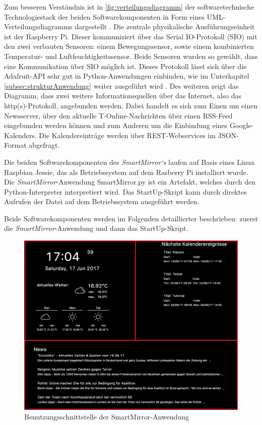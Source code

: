 Zum besseren Verständnis ist in \autoref{fig:verteilungsdiagramm} der softwaretechnische Technologiestack der beiden Softwarekomponenten in Form eines UML-Verteilungsdiagramms dargestellt \cite{booch1999uml}. Die zentrale physikalische Ausführungseinheit ist der Raspberry Pi. Dieser kommuniziert über das Serial IO-Protokoll (SIO) mit den zwei verbauten Sensoren: einem Bewegungssensor, sowie einem kombinierten Temperatur- und Luftfeuchtigkeitssensor. Beide Sensoren wurden so gewählt, dass eine Kommunikation über SIO möglich ist. Dieses Protokoll lässt sich über die Adafruit-API sehr gut in Python-Anwendungen einbinden, wie im Unterkapitel \autoref{subsec:strukturAnwendung} weiter ausgeführt wird \cite{adafruit2017}. Des weiteren zeigt das Diagramm, dass zwei weitere Informationsquellen über das Internet, also das http(s)-Protokoll, angebunden werden. Dabei handelt es sich zum Einen um  
einen Newsserver, über den aktuelle T-Online-Nachrichten über einen RSS-Feed eingebunden werden können und zum Anderen um die Einbindung eines Google-Kalenders\cite{feedparserLib}\cite{vayssiere2004system}. Die Kalendereinträge werden über  REST-Webservices im JSON-Format abgefragt\cite{bricalliweb}\cite{bray2014javascript}. 

Die beiden Softwarekomponenten des \textit{SmartMirror`s} laufen auf Basis eines Linux Raspbian Jessie, das als Betriebssystem auf dem Rasberry Pi installiert wurde. Die \textit{SmartMirror}-Anwendung \glqq SmartMirror.py \grqq ist ein Artefakt, welches durch den Python-Interpreter interpretiert wird. Das StartUp-Skript kann durch direktes Aufrufen der Datei auf dem Betriebssystem ausgeführt werden. 

Beide Softwarekomponenten werden im Folgenden detaillierter beschrieben: zuerst die \textit{SmartMirror}-Anwendung und dann das StartUp-Skript.

\begin{figure}
	\centering
	\includegraphics[width=0.8\linewidth]{bilder/grafOberflaeche}
	\caption[Benutzungsschnittstelle der SmartMirror-Anwendung]{Benutzungsschnittstelle der SmartMirror-Anwendung}
	\label{fig:grafoberflaeche}
\end{figure}


